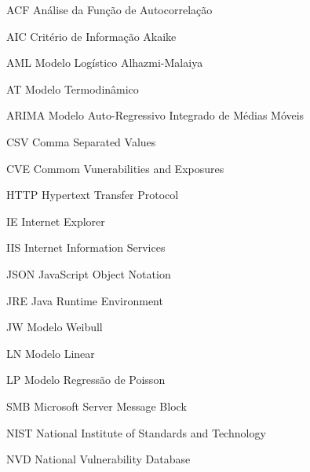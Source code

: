 \begin{siglas} %
	
	
	
	
	
	
	
	
	
	
	
    \item[ACF] Análise da Função de Autocorrelação
    \item[AIC] Critério de Informação Akaike
    \item[AML] Modelo Logístico Alhazmi-Malaiya
    \item[AT] Modelo Termodinâmico
    \item[ARIMA] Modelo Auto-Regressivo Integrado de Médias Móveis
	
	
	\item[CSV] Comma Separated Values
    \item[CVE] Commom Vunerabilities and Exposures
	
	
	
	
	
    \item[HTTP] Hypertext Transfer Protocol
	
	\item[IE] Internet Explorer
    \item[IIS] Internet Information Services	
    
    \item[JSON] JavaScript Object Notation
	\item[JRE] Java Runtime Environment
    \item[JW] Modelo Weibull
	
	
    \item[LN] Modelo Linear
    \item[LP] Modelo Regressão de Poisson
	
    \item[SMB] Microsoft Server Message Block
	
    \item[NIST] National Institute of Standards and Technology
	\item[NVD] National Vulnerability Database
    

\end{siglas}
